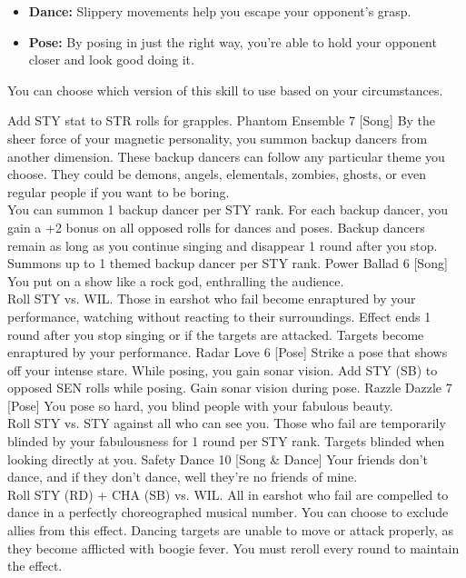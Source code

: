 \begin{path}
{\begin{itemize}
\item \textbf{Dance:}   Slippery movements help you escape your opponent's grasp.
\item \textbf{Pose:}   By posing in just the right way, you're able to hold your opponent closer and look good doing it.
\end{itemize}
You can choose which version of this skill to use based on your circumstances.}
{Add STY stat to STR rolls for grapples.}
\skilldescription
{Phantom Ensemble}
{7}
[Song]
{By the sheer force of your magnetic personality, you summon backup dancers from another dimension. These backup dancers can follow any particular theme you choose. They could be demons, angels, elementals, zombies, ghosts, or even regular people if you want to be boring.
\\You can summon 1 backup dancer per STY rank. For each backup dancer, you gain a +2 bonus on all opposed rolls for dances and poses. Backup dancers remain as long as you continue singing and disappear 1 round after you stop. }
{Summons up to 1 themed backup dancer per STY rank.}
\skilldescription
{Power Ballad}
{6}
[Song]
{You put on a show like a rock god, enthralling the audience.
\\Roll STY vs. WIL. Those in earshot who fail become enraptured by your performance, watching without reacting to their surroundings. Effect ends 1 round after you stop singing or if the targets are attacked.}
{Targets become enraptured by your performance.}
\skilldescription
{Radar Love}
{6}
[Pose]
{Strike a pose that shows off your intense stare. While posing, you gain sonar vision. Add STY (SB) to opposed SEN rolls while posing.}
{Gain sonar vision during pose.}
\skilldescription
{Razzle Dazzle}
{7}
[Pose]
{You pose so hard, you blind people with your fabulous beauty.
\\Roll STY vs. STY against all who can see you. Those who fail are temporarily blinded by your fabulousness for 1 round per STY rank.}
{Targets blinded when looking directly at you.}
\skilldescription
{Safety Dance}
{10}
[Song \& Dance]
{Your friends don't dance, and if they don't dance, well they're no friends of mine.
\\Roll STY (RD) + CHA (SB) vs. WIL. All in earshot who fail are compelled to dance in a perfectly choreographed musical number. You can choose to exclude allies from this effect. Dancing targets are unable to move or attack properly, as they become afflicted with boogie fever. You must reroll every round to maintain the effect.}

\end{path}
